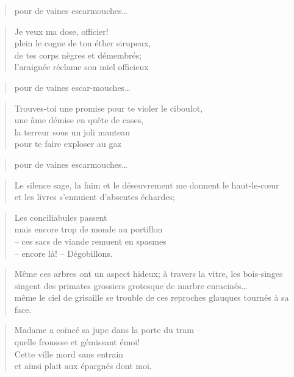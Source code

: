   \begin{verse}
    pour de vaines escarmouches…
  \end{verse}
  \begin{verse}
    Je veux ma dose, officier!\\
    plein le cogne de ton éther sirupeux,\\
    de tes corps nègres et démembrés;\\
    l’araignée réclame son miel officieux
  \end{verse}
  \begin{verse}
    pour de vaines escar-mouches…
  \end{verse}
  \begin{verse}
    Trouves-toi une promise pour te violer le ciboulot,\\
    une âme démise en quête de cases,\\
    la terreur sous un joli manteau\\
    pour te faire exploser au gaz
  \end{verse}
  \begin{verse}
    pour de vaines escarmouches…
  \end{verse}
  \begin{verse}
    Le silence sage, la faim et le déseuvrement me donnent le haut-le-cœur\\
    et les livres s’ennuient d’absentes échardes;
  \end{verse}
  \begin{verse}
    Les conciliabules passent\\
    mais encore trop de monde au portillon\\
    -- ces sacs de viande remuent en spasmes\\
    -- encore là! -- Dégobillons.
  \end{verse}
  \begin{verse}
    Même ces arbres ont un aspect  hideux; à travers la vitre, les bois-singes
    singent des primates grossiers grotesque de marbre enracinés…\\
    même le ciel de grisaille se trouble de ces reproches glauques tournés à sa face.
  \end{verse}
  \begin{verse}
    Madame a coincé sa jupe dans la porte du tram --\\
    quelle froussse et gémissant émoi!\\
    Cette ville mord sans entrain\\
    et ainsi plait aux épargnés dont moi.
  \end{verse}
